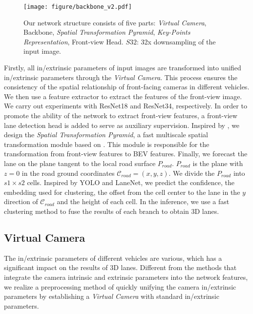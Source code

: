 \documentclass[10pt,twocolumn,letterpaper]{article}
\begin{document}
\begin{figure*}[t]
    \centering
\texttt{[image: figure/backbone\_v2.pdf]}
\caption{Our network structure consists of five parts: \textit{Virtual Camera}, Backbone, \textit{Spatial Transformation Pyramid}, \textit{Key-Points Representation}, Front-view Head. $S32$: 32x downsampling of the input image.}
    \label{fig:backbone}
\end{figure*}
Firstly, all in/extrinsic parameters of input images are transformed into unified in/extrinsic parameters through the \textit{Virtual Camera}. This process ensures the consistency of the spatial relationship of front-facing cameras in different vehicles. We then use a feature extractor to extract the features of the front-view image. We carry out experiments with ResNet18 and ResNet34, respectively\cite{he2016deep}. In order to promote the ability of the network to extract front-view features, a front-view lane detection head is added to serve as auxiliary supervision. Inspired by \cite{lin2017feature}, we design the \textit{Spatial Transformation Pyramid}, a fast multiscale spatial transformation module based on \cite{pan2020cross}. This module is responsible for the transformation from front-view features to BEV features. Finally, we forecast the lane on the plane tangent to the local road surface $P_{road}$. $P_{road}$ is the plane with $z=0$ in the road ground coordinates $\mathcal{C}_{road}=\left(x,y,z\right)$. We divide the $P_{road}$ into $s1 \times s2$ cells. Inspired by YOLO\cite{redmon2016you} and LaneNet\cite{neven2018towards}, we predict the confidence, the embedding used for clustering, the offset from the cell center to the lane in the $y$ direction of $\mathcal{C}_{road}$ and the height of each cell. In the inference, we use a fast clustering method to fuse the results of each branch to obtain 3D lanes.

\subsection{Virtual Camera}
\label{subsec:virtual}
The in/extrinsic parameters of different vehicles are various, which has a significant impact on the results of 3D lanes. Different from the methods that integrate the camera intrinsic and extrinsic parameters into the network features\cite{chen2022persformer,philion2020lift}, we realize a preprocessing method of quickly unifying the camera in/extrinsic parameters by establishing a \textit{Virtual Camera} with standard in/extrinsic parameters.
\end{document}
